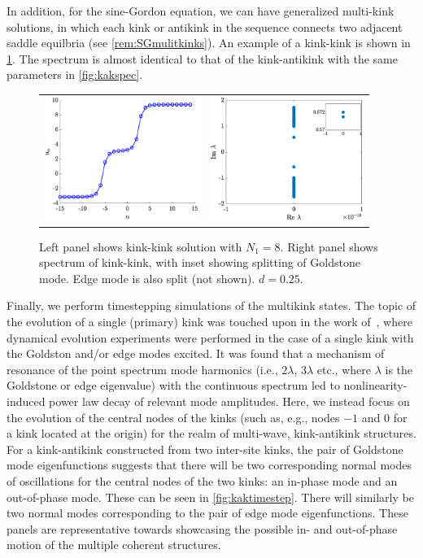 \documentclass[12pt,reqno]{amsart}
\def\noi{\noindent}
\begin{document}
\noi In addition, for the sine-Gordon equation, we can have generalized multi-kink solutions, in which each kink or antikink in the sequence connects two adjacent saddle equilbria (see \cref{rem:SGmulitkinks}). An example of a kink-kink is shown in \cref{fig:kk50}. The spectrum is almost identical to that of the kink-antikink with the same parameters in \cref{fig:kakspec}.
\begin{figure}[H]
	\begin{center}
	\begin{tabular}{cc}
	\includegraphics[width=5cm]{kk50.eps} &
	\includegraphics[width=5cm]{kk50spec.eps}
	\end{tabular}
	\end{center}
	\caption{Left panel shows kink-kink solution with $N_1 = 8$. Right panel shows spectrum of kink-kink, with inset showing splitting of Goldstone mode. Edge mode is also split (not shown). $d = 0.25$. }
	\label{fig:kk50}
\end{figure}

Finally, we perform timestepping simulations of the multikink
states. The topic of the evolution of
a single (primary) kink was touched upon in the work
of~\cite{KevrekidisWeinstein2000}, where dynamical
evolution experiments were performed in the case
of a single kink with the Goldston and/or edge
modes excited. It was found that a mechanism of
resonance of the point spectrum mode harmonics
(i.e., $2 \lambda$, $3 \lambda$ etc., 
where $\lambda$ is the Goldstone
or edge eigenvalue) with the continuous spectrum
led to nonlinearity-induced power law decay of
relevant mode amplitudes. Here, we instead focus on the evolution
of the central nodes of the kinks (such as, e.g., nodes
$-1$ and $0$ for a kink located at the origin) for the
realm of multi-wave, kink-antikink structures.
For a kink-antikink constructed from two inter-site kinks, the pair of Goldstone mode eigenfunctions suggests that there will be two corresponding normal modes of oscillations for the central nodes of the two kinks: an in-phase mode and an out-of-phase mode. These can be seen in \cref{fig:kaktimestep}. There will similarly be two normal modes corresponding to the pair of edge mode eigenfunctions.
These panels are representative towards showcasing
the possible in- and out-of-phase motion of the multiple 
coherent structures.
\end{document}
